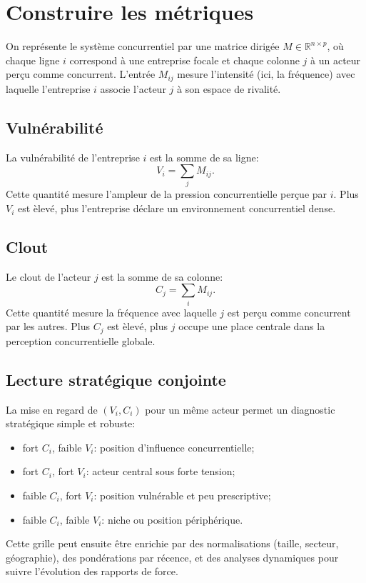 \documentclass[11pt,a4paper]{article}
\begin{document}
\section{Construire les m\'etriques}
On repr\'esente le syst\`eme concurrentiel par une matrice dirig\'ee $M \in \mathbb{R}^{n \times p}$, o\`u chaque ligne $i$ correspond \`a une entreprise focale et chaque colonne $j$ \`a un acteur per\c cu comme concurrent. L'entr\'ee $M_{ij}$ mesure l'intensit\'e (ici, la fr\'equence) avec laquelle l'entreprise $i$ associe l'acteur $j$ \`a son espace de rivalit\'e.

\subsection*{Vuln\'erabilit\'e}
La vuln\'erabilit\'e de l'entreprise $i$ est la somme de sa ligne:
\[
V_i = \sum_j M_{ij}.
\]
Cette quantit\'e mesure l'ampleur de la pression concurrentielle per\c cue par $i$. Plus $V_i$ est \`elev\'e, plus l'entreprise d\'eclare un environnement concurrentiel dense.

\subsection*{Clout}
Le clout de l'acteur $j$ est la somme de sa colonne:
\[
C_j = \sum_i M_{ij}.
\]
Cette quantit\'e mesure la fr\'equence avec laquelle $j$ est per\c cu comme concurrent par les autres. Plus $C_j$ est \`elev\'e, plus $j$ occupe une place centrale dans la perception concurrentielle globale.

\subsection*{Lecture strat\'egique conjointe}
La mise en regard de $(V_i, C_i)$ pour un m\^eme acteur permet un diagnostic strat\'egique simple et robuste:
\begin{itemize}
    \item fort $C_i$, faible $V_i$: position d'influence concurrentielle;
    \item fort $C_i$, fort $V_i$: acteur central sous forte tension;
    \item faible $C_i$, fort $V_i$: position vuln\'erable et peu prescriptive;
    \item faible $C_i$, faible $V_i$: niche ou position p\'eriph\'erique.
\end{itemize}

Cette grille peut ensuite \^etre enrichie par des normalisations (taille, secteur, g\'eographie), des pond\'erations par r\'ecence, et des analyses dynamiques pour suivre l'\'evolution des rapports de force.
\end{document}
